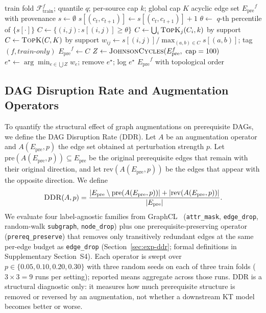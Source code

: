 \documentclass[pdflatex,sn-mathphys-num]{sn-jnl}
\newcommand{\Epre}{\ensuremath{E_{\text{pre}}}}
\newcommand{\DDR}{\textsc{DDR}}
\begin{document}
\begin{algorithm}[t]
\caption{Train-only prerequisite graph construction with DAG audit}
\label{alg:graph-build}
\begin{algorithmic}[1]
\Require train fold $\mathcal{F}^f_{\text{train}}$; quantile $q$; per-source cap
  $k$; global cap $K$
\Ensure acyclic edge set $\Epre^f$ with provenance
\State $s \gets \emptyset$ 
    \State $s[(c_t,c_{t+1})] \gets s[(c_t,c_{t+1})] + 1$
  \EndFor
\EndFor
\State $\theta \gets$ $q$-th percentile of $\{s[\cdot]\}$ 
\State $C \gets \{(i,j) : s[(i,j)] \ge \theta\}$
\State $C \gets \bigcup_{i} \textsc{TopK}_{j}(C_i, k)$ by support 
\State $C \gets \textsc{TopK}(C, K)$ by support 
  \State $w_{ij} \gets s[(i,j)]/\max_{(a,b)\in C} s[(a,b)]$; tag $(f,\textit{train-only})$
\EndFor
\State $\Epre^f \gets C$
\While{$\Epre^f$ contains a cycle} 
  \State $Z \gets \textsc{JohnsonCycles}(\Epre^f,\ \text{cap}=100)$
  \State $e^\star \gets \arg\min_{e\in\bigcup Z} w_e$; remove $e^\star$; log $e^\star$
\EndWhile
\State \Return $\Epre^f$ with topological order
\end{algorithmic}
\end{algorithm}

\subsection{DAG Disruption Rate and Augmentation Operators}
\label{sec:ddr}
To quantify the structural effect of graph augmentations on prerequisite
DAGs, we define the DAG Disruption Rate (\DDR{}). Let $A$ be an
augmentation operator and $A(\Epre,p)$ the edge set obtained at
perturbation strength $p$. Let $\mathrm{pre}(A(\Epre,p))\subseteq\Epre$
be the original prerequisite edges that remain with their original
direction, and let $\mathrm{rev}(A(\Epre,p))$ be the edges that appear
with the opposite direction. We define
\begin{equation}
\DDR(A,p)=
\frac{|\Epre\setminus \mathrm{pre}(A(\Epre,p))|
      +|\mathrm{rev}(A(\Epre,p))|}
     {|\Epre|}.
\label{eq:ddr}
\end{equation}
We evaluate four label-agnostic families from GraphCL~\cite{you2020graphcl}
(\texttt{attr\_mask}, \texttt{edge\_drop}, random-walk \texttt{subgraph},
\texttt{node\_drop}) plus one prerequisite-preserving operator
(\texttt{prereq\_preserve}) that removes only transitively redundant edges at
the same per-edge budget as \texttt{edge\_drop} (Section~\ref{sec:exp-ddr};
formal definitions in Supplementary Section~S4).
Each operator is swept over $p\in\{0.05,0.10,0.20,0.30\}$ with three
random seeds on each of three train folds ($3\times 3=9$ runs per
setting); reported means aggregate across those runs. \DDR{} is a structural diagnostic only: it measures how
much prerequisite structure is removed or reversed by an augmentation,
not whether a downstream KT model becomes better or worse.
\end{document}
